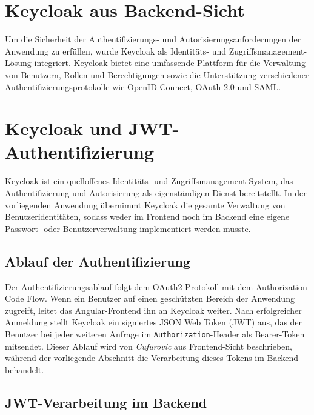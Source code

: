 \section{Keycloak aus Backend-Sicht}

Um die Sicherheit der Authentifizierungs- und Autorisierungsanforderungen der Anwendung zu erfüllen, 
wurde Keycloak als Identitäts- und Zugriffsmanagement-Lösung integriert. 
Keycloak bietet eine umfassende Plattform für die Verwaltung von Benutzern, 
Rollen und Berechtigungen sowie die Unterstützung verschiedener Authentifizierungsprotokolle 
wie OpenID Connect, OAuth 2.0 und SAML.




\section{Keycloak und JWT-Authentifizierung}

Keycloak ist ein quelloffenes Identitäts- und Zugriffsmanagement-System, das
Authentifizierung und Autorisierung als eigenständigen Dienst bereitstellt.
In der vorliegenden Anwendung übernimmt Keycloak die gesamte Verwaltung von
Benutzeridentitäten, sodass weder im Frontend noch im Backend eine eigene
Passwort- oder Benutzerverwaltung implementiert werden musste.

\subsection{Ablauf der Authentifizierung}

Der Authentifizierungsablauf folgt dem OAuth2-Protokoll mit dem Authorization
Code Flow. Wenn ein Benutzer auf einen geschützten Bereich der Anwendung
zugreift, leitet das Angular-Frontend ihn an Keycloak weiter. Nach erfolgreicher
Anmeldung stellt Keycloak ein signiertes JSON Web Token (JWT) aus, das der
Benutzer bei jeder weiteren Anfrage im \texttt{Authorization}-Header als
Bearer-Token mitsendet. Dieser Ablauf wird von \textit{Cufurovic} aus
Frontend-Sicht beschrieben, während der vorliegende Abschnitt die Verarbeitung
dieses Tokens im Backend behandelt.

\subsection{JWT-Verarbeitung im Backend}

